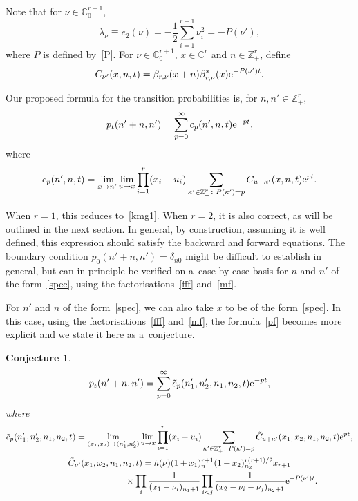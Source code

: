 \documentclass[pdftex]{sigma}
\newtheorem{conj}[thm]{Conjecture}
\theoremstyle{definition}
\newcommand{\C}{{\mathbb C}}
\newcommand\Z{{\mathbb Z}}
\begin{document}
Note that for $\nu\in\C^{r+1}_0$,
\[\lambda_\nu\equiv e_2(\nu)=-\frac12 \sum_{i=1}^{r+1}\nu_i^2=-P(\nu'),\]
where $P$ is defined by~\eqref{P}. For $\nu\in\C_{0}^{r+1}$, $x\in\C^r$ and $n\in\Z_+^r$, define
\[C_{\nu'}(x,n,t)=\beta_{r,\nu}(x+n) \beta^*_{r,\nu}(x) {\rm e}^{-P(\nu') t}.\]

Our proposed formula for the transition probabilities is, for $n,n'\in\Z_+^r$,
\begin{equation}\label{pf} p_t(n'+n,n')=\sum_{p=0}^\infty c_p(n',n,t) {\rm e}^{-pt},\end{equation}
where
\[ c_p(n',n,t) = \lim_{x\to n'}\lim_{u\to x} \prod_{i=1}^r(x_i-u_i)
\sum_{\kappa'\in\Z_+^r\colon P(\kappa')=p} C_{u+\kappa'}(x,n,t) {\rm e}^{p t}.\]

When $r=1$, this reduces to~\eqref{kmg1}. When $r=2$, it is also correct, as will be outlined in the next section.
In general, by construction, assuming it is well defined, this expression should satisfy the backward
and forward equations. The boundary condition $p_{0}(n'+n,n')=\delta_{n0}$ might be difficult to
establish in general, but can in principle be verified on a~case by case basis for $n$ and $n'$ of the form~\eqref{spec},
using the factorisations~\eqref{fff} and~\eqref{mf}.

For $n'$ and $n$ of the form~\eqref{spec}, we can also take $x$ to be of the form~\eqref{spec}.
In this case, using the factorisations~\eqref{fff} and~\eqref{mf}, the formula~\eqref{pf} becomes
more explicit and we state it here as a~conjecture.

\begin{conj}
\begin{equation}\label{atr-nn}
p_t(n'+n,n')=\sum_{p=0}^\infty \tilde c_p(n_1',n_2',n_1,n_2,t) {\rm e}^{-pt},\end{equation}
where
\begin{gather*}
 \tilde c_p(n_1',n_2',n_1,n_2,t)=
 \lim_{(x_1,x_2)\to (n_1',n_2')}\lim_{u\to x} \prod_{i=1}^r(x_i-u_i)
\sum_{\kappa'\in\Z_+^r\colon P(\kappa')=p} \tilde C_{u+\kappa'}(x_1,x_2,n_1,n_2,t) {\rm e}^{pt},\\
\tilde C_{\nu'}(x_1,x_2,n_1,n_2,t) = h(\nu) (1+x_1)_{n_1}^{r+1} (1+x_2)_{n_2}^{r(r+1)/2} x_{r+1} \\
\phantom{\tilde C_{\nu'}(x_1,x_2,n_1,n_2,t) =}{} \times \prod_i \frac1{(x_1-\nu_i)_{n_1+1}} \prod_{ i<j}\frac1{(x_2-\nu_i-\nu_j)_{n_2+1}} {\rm e}^{-P(\nu') t}.
\end{gather*}
\end{conj}
\end{document}
